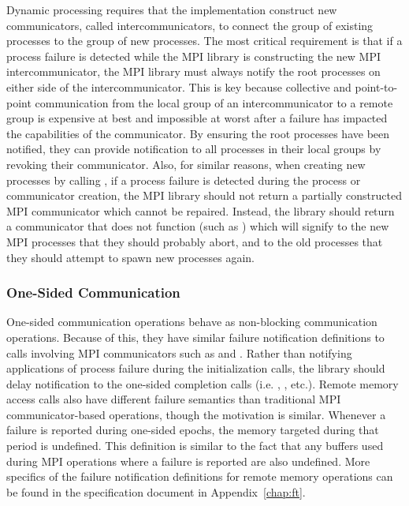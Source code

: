 Dynamic processing requires that the \mpi implementation construct new communicators, 
called intercommunicators, to connect the group of existing processes to the group of 
new processes. The most critical requirement is that if a process failure is detected 
while the MPI library is constructing the new MPI intercommunicator, the MPI 
library must always notify the root processes on either side of the 
intercommunicator. This is key because collective and point-to-point 
communication from the local group of an intercommunicator
to a remote group is expensive at best and impossible at worst after a failure has 
impacted the capabilities of the communicator. By ensuring the
root processes have been notified, they can provide notification to all 
processes in their local groups by revoking their communicator. Also, for 
similar reasons, when creating new processes by calling 
, if a process failure is detected during the process 
or communicator creation, the MPI library should not return a partially 
constructed MPI communicator which cannot be repaired. Instead, the library 
should return a communicator that does not function (such as 
) which will signify to the new MPI processes that they 
should probably abort, and to the old processes that they should attempt to spawn 
new processes again.

\subsubsection{One-Sided Communication}

One-sided communication operations behave as non-blocking communication 
operations. Because of this, they have similar failure notification definitions 
to calls involving MPI communicators such as  and 
. Rather than notifying applications of process failure 
during the initialization calls, the library should delay notification to the 
one-sided completion calls (i.e. , 
, etc.). Remote memory access calls also have different 
failure semantics than traditional MPI communicator-based operations, though the 
motivation is similar. Whenever a failure is reported during one-sided epochs, 
the memory targeted during that period is undefined. This definition is similar 
to the fact that any buffers used during MPI operations where a failure is 
reported are also undefined. More specifics of the failure notification 
definitions for remote memory operations can be found in the specification 
document in Appendix~\ref{chap:ft}.

